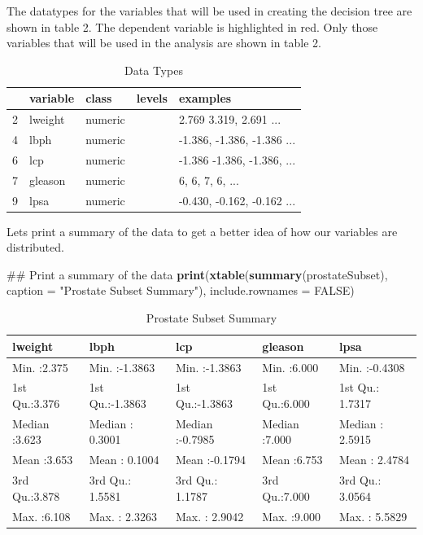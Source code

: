 \documentclass[]{article}
\newenvironment{Shaded}{\begin{snugshade}}{\end{snugshade}}
\newcommand{\KeywordTok}[1]{\textcolor[rgb]{0.13,0.29,0.53}{\textbf{#1}}}
\newcommand{\DataTypeTok}[1]{\textcolor[rgb]{0.13,0.29,0.53}{#1}}
\newcommand{\StringTok}[1]{\textcolor[rgb]{0.31,0.60,0.02}{#1}}
\newcommand{\OtherTok}[1]{\textcolor[rgb]{0.56,0.35,0.01}{#1}}
\newcommand{\NormalTok}[1]{#1}
\renewcommand{\&}{and}
\begin{document}
The datatypes for the variables that will be used in creating the
decision tree are shown in table 2. The dependent variable is
highlighted in red. Only those variables that will be used in the
analysis are shown in table 2.

\begin{table}[htb]
\centering
\caption{Data Types} 
\vspace{0.2cm}
\begin{tabular}{rllll}
  \hline
 & variable & class & levels & examples \\ 
  \hline
   2 & lweight & numeric &  & 2.769 3.319, 2.691 ... \\ 
   4 & lbph & numeric &  & -1.386, -1.386, -1.386 ... \\ 
  \rowcolor{red!30} 6 & lcp & numeric &  & -1.386 -1.386, -1.386, ... \\ 
   7 & gleason & numeric &  & 6, 6, 7, 6, ... \\ 
   9 & lpsa & numeric &  & -0.430, -0.162, -0.162 ... \\ 
   \hline
\end{tabular}
\end{table}

Lets print a summary of the data to get a better idea of how our
variables are distributed.

\begin{Shaded}
\begin{Highlighting}[]
\NormalTok{## Print a summary of the data}
\KeywordTok{print}\NormalTok{(}\KeywordTok{xtable}\NormalTok{(}\KeywordTok{summary}\NormalTok{(prostateSubset), }\DataTypeTok{caption =} \StringTok{"Prostate Subset Summary"}\NormalTok{), }
      \DataTypeTok{include.rownames =} \OtherTok{FALSE}\NormalTok{)}
\end{Highlighting}
\end{Shaded}

\begin{table}[htb]
\centering
\caption{Prostate Subset Summary} 
\vspace{0.2cm}
\begin{tabular}{lllll}
  \hline
   lweight &      lbph &      lcp &    gleason &      lpsa \\ 
  \hline
Min.   :2.375   & Min.   :-1.3863   & Min.   :-1.3863   & Min.   :6.000   & Min.   :-0.4308   \\ 
  1st Qu.:3.376   & 1st Qu.:-1.3863   & 1st Qu.:-1.3863   & 1st Qu.:6.000   & 1st Qu.: 1.7317   \\ 
  Median :3.623   & Median : 0.3001   & Median :-0.7985   & Median :7.000   & Median : 2.5915   \\ 
  Mean   :3.653   & Mean   : 0.1004   & Mean   :-0.1794   & Mean   :6.753   & Mean   : 2.4784   \\ 
  3rd Qu.:3.878   & 3rd Qu.: 1.5581   & 3rd Qu.: 1.1787   & 3rd Qu.:7.000   & 3rd Qu.: 3.0564   \\ 
  Max.   :6.108   & Max.   : 2.3263   & Max.   : 2.9042   & Max.   :9.000   & Max.   : 5.5829   \\ 
   \hline
\end{tabular}
\end{table}
\end{document}
